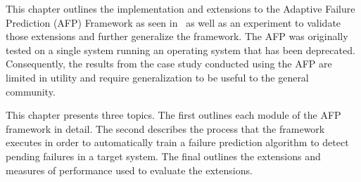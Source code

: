 This chapter outlines the implementation and extensions to the Adaptive Failure
Prediction (AFP) Framework as seen in~\cite{irrera2015} as well as an
experiment to validate those extensions and further generalize the framework.
The AFP was originally tested on a single system running an operating system
that has been deprecated.  Consequently, the results from the case study
conducted using the AFP are limited in utility and require generalization to be
useful to the general community.

This chapter presents three topics.  The first outlines each module of the AFP
framework in detail.  The second describes the process that the framework
executes in order to automatically train a failure prediction algorithm to
detect pending failures in a target system.  The final outlines the extensions
and measures of performance used to evaluate the extensions.
